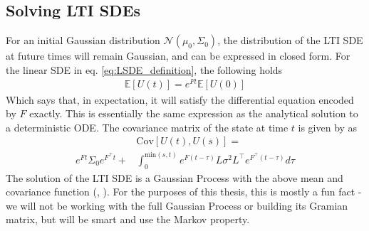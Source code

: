 \subsection*{Solving LTI SDEs}
For an initial Gaussian distribution $\mathcal{N}(\mu_0, \Sigma_0)$, the distribution of the LTI SDE at future times will remain Gaussian, and can be expressed in closed form. For the linear SDE in eq. \ref{eq:LSDE_definition}, the following holds
\begin{align}\label{eq:SDE_mean}
    \mathbb{E}[U(t)] = e^{Ft}\mathbb{E}[U(0)]
\end{align}
Which says that, in expectation, it will satisfy the differential equation encoded by $F$ exactly. This is essentially the same expression as the analytical solution to a deterministic ODE. The covariance matrix of the state at time $t$ is given by \cite{invention_of_ODE_solver} as
\begin{align}\label{eq:SDE_cov}
    &\text{Cov}[U(t), U(s)] = \nonumber \\ e^{Ft}\Sigma_0e^{F^\top t} 
    + &\int_0^{\text{min}(s,t)} e^{F(t-\tau)}L\sigma^2L^\top e^{F^\top(t-\tau)} d\tau
\end{align}
The solution of the LTI SDE is a Gaussian Process with the above mean and covariance function (\cite{probnum}, \cite{gp_Rasmussen}). For the purposes of this thesis, this is mostly a fun fact - we will not be working with the full Gaussian Process or building its Gramian matrix, but will be smart and use the Markov property.
